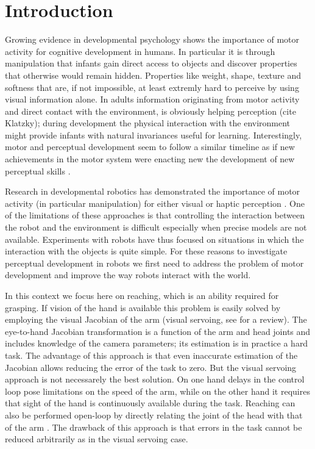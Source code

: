 \section{Introduction}
Growing evidence in developmental psychology shows the importance 
of motor activity for cognitive development in humans. In particular 
it is through manipulation that infants gain direct access to objects 
and discover properties that otherwise would remain hidden. 
Properties like weight, shape, texture and softness that 
are, if not impossible, at least extremly hard to perceive by using
visual information alone. In adults information originating 
from motor activity and direct contact with the environment, is 
obviously helping perception (cite Klatzky); during development
the physical interaction with the environment might
provide infants with natural invariances useful for learning.
Interestingly, motor and perceptual development seem to follow a similar 
timeline as if new achievements in the motor system were enacting new
the development of new perceptual skills 
\cite{bushnell93motor}.

Research in developmental robotics has demonstrated the importance of
motor activity (in particular manipulation) for either visual or haptic 
perception \cite{fitzpatrick07shared}. One of the 
limitations of these approaches is that controlling the interaction between
the robot and the environment is difficult especially when precise models are
not available. Experiments with robots have thus focused on situations
in which the interaction with the objects is quite simple. For these reasons
to investigate perceptual development in robots we first need to 
address the problem of motor development and improve the way robots interact
with the world.

In this context we focus here on reaching, which is an ability required for 
grasping. If vision of the hand is available this problem is easily solved 
by employing the visual Jacobian of the arm (visual servoing, see 
\cite{hutchinson96tutorial} for a review). The 
eye-to-hand Jacobian transformation is a function of the arm and head joints 
and includes knowledge of the camera parameters; its estimation is in practice 
a hard task.
The advantage of this approach is that even inaccurate estimation of the Jacobian
allows reducing the error of the task to zero. But the visual servoing approach 
is not necessarely the best solution. On one hand delays in the control loop pose 
limitations on the speed of the arm, while on the other hand it
requires that sight of the hand is continuously available during the task. 
Reaching can also be performed open-loop by directly relating the joint of 
the head with that of the arm 
\cite{blackburn94learning,metta99developmental}. 
The drawback of this approach is that errors in the task cannot be reduced 
arbitrarily as in the visual servoing case.

